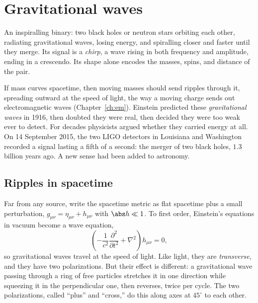 \chapter{Gravitational waves}
\label{ch:gw}



\begin{prototype}
An inspiralling binary: two black holes or neutron stars orbiting each other, radiating gravitational waves, losing energy, and spiralling closer and faster until they merge. Its signal is a \emph{chirp}, a wave rising in both frequency and amplitude, ending in a crescendo. Its shape alone encodes the masses, spins, and distance of the pair.
\end{prototype}

If mass curves spacetime, then moving masses should send ripples through it, spreading outward at the speed of light, the way a moving charge sends out electromagnetic waves (Chapter~\ref{ch:em}). Einstein predicted these \emph{gravitational waves} in 1916, then doubted they were real, then decided they were too weak ever to detect. For decades physicists argued whether they carried energy at all. On 14 September 2015, the two LIGO detectors in Louisiana and Washington recorded a signal lasting a fifth of a second: the merger of two black holes, $1.3$ billion years ago. A new sense had been added to astronomy.

\section{Ripples in spacetime}

Far from any source, write the spacetime metric as flat spacetime plus a small perturbation, $g_{\mu\nu} = \eta_{\mu\nu} + h_{\mu\nu}$ with $\abs h\ll1$. To first order, Einstein's equations in vacuum become a wave equation,
\[
  \left(-\frac{1}{c^2}\frac{\partial^2}{\partial t^2} + \nabla^2\right)h_{\mu\nu} = 0,
\]
so gravitational waves travel at the speed of light. Like light, they are \emph{transverse}, and they have two polarizations. But their effect is different: a gravitational wave passing through a ring of free particles stretches it in one direction while squeezing it in the perpendicular one, then reverses, twice per cycle. The two polarizations, called ``plus'' and ``cross,'' do this along axes at $45^\circ$ to each other.

